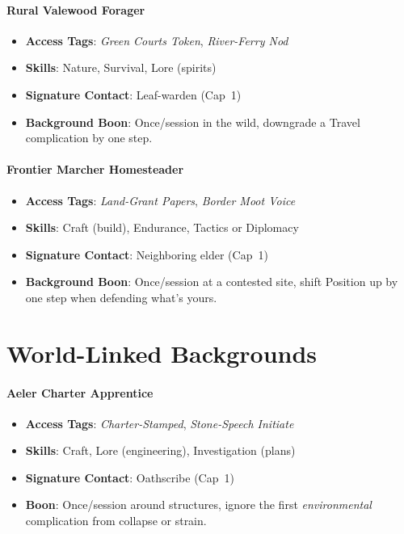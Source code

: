 \begin{multicols}{2}
\paragraph{Rural Valewood Forager}
\begin{itemize}
\item \textbf{Access Tags}: \textit{Green Courts Token}, \textit{River-Ferry Nod}
\item \textbf{Skills}: Nature, Survival, Lore (spirits)
\item \textbf{Signature Contact}: Leaf-warden (Cap~1)
\item \textbf{Background Boon}: Once/session in the wild, downgrade a Travel complication by one step.
\end{itemize}

\paragraph{Frontier Marcher Homesteader}
\begin{itemize}
\item \textbf{Access Tags}: \textit{Land-Grant Papers}, \textit{Border Moot Voice}
\item \textbf{Skills}: Craft (build), Endurance, Tactics or Diplomacy
\item \textbf{Signature Contact}: Neighboring elder (Cap~1)
\item \textbf{Background Boon}: Once/session at a contested site, shift Position up by one step when defending what’s yours.
\end{itemize}

\section{World-Linked Backgrounds}

\paragraph{Aeler Charter Apprentice}
\begin{itemize}
\item \textbf{Access Tags}: \textit{Charter-Stamped}, \textit{Stone-Speech Initiate}
\item \textbf{Skills}: Craft, Lore (engineering), Investigation (plans)
\item \textbf{Signature Contact}: Oathscribe (Cap~1)
\item \textbf{Boon}: Once/session around structures, ignore the first \emph{environmental} complication from collapse or strain.
\end{itemize}


\end{multicols}
